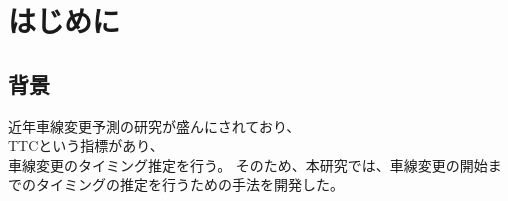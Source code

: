 \chapter{はじめに}
 \section{背景}
近年車線変更予測の研究が盛んにされており、
\\
TTCという指標があり、
\\
車線変更のタイミング推定を行う。
そのため、本研究では、車線変更の開始までのタイミングの推定を行うための手法を開発した。
\\
